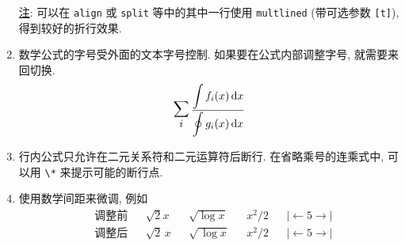 \documentclass[UTF8,no-math]{ctexart}
\newcommand{\D}{\displaystyle}
\numberwithin{enumi}{section}
\begin{document}
\begin{enumerate}
        \uline{\fangsong 注}: 可以在 \verb|align| 或 \verb|split| 等中的其中一行使用 \verb|multlined| (带可选参数 \verb|[t]|), 得到较好的折行效果.
        \item 数学公式的字号受外面的文本字号控制. 如果要在公式内部调整字号, 就需要来回切换. 
        \begin{equation}
        \mathop{\text{\Large$\D\sum_i$}}\dfrac{\D\int f_i(x)\dif x}{\D\oint g_i(x)\dif x}
        \end{equation}
        \item 行内公式只允许在二元关系符和二元运算符后断行. 在省略乘号的连乘式中, 可以用 \verb|\*| 来提示可能的断行点. \par  
        \item 使用数学间距来微调, 例如
        \begin{align}
            &\text{调整前} &&\sqrt2x && \sqrt{\log x} && x^2/2 && \vert{\gets}5{\to}\vert \\
            &\text{调整后} &&\sqrt2\,x && \sqrt{\,\log x} && x^2\!/2 && \vert\!{\gets}5{\to}\!\vert 
        \end{align}
    \end{enumerate}
\end{document}
